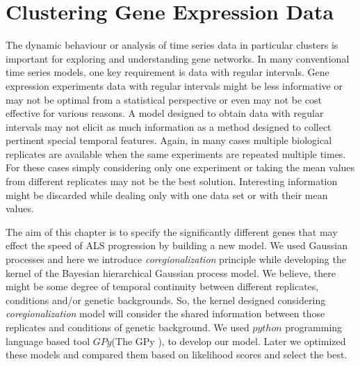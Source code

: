 
\chapter{Clustering Gene Expression Data}\label{ch:Clustering_Gene_Expression_Data}

\ifpdf
    \graphicspath{{Chapter5/Figs/Raster/}{Chapter5/Figs/PDF/}{Chapter5/Figs/}}
\else
    \graphicspath{{Chapter5/Figs/Vector/}{Chapter5/Figs/}}
\fi

The dynamic behaviour or analysis of time series data in particular clusters is important for exploring and understanding gene networks. In many conventional time series models, one key requirement is data with regular intervals. Gene expression experiments data with regular intervals might be less informative or may not be optimal from a statistical perspective or even may not be cost effective for various reasons. A model designed to obtain data with regular intervals may not elicit as much information as a method designed to collect pertinent special temporal features. Again, in many cases multiple biological replicates are available when the same experiments are repeated multiple times. For these cases simply considering only one experiment or taking the mean values from different replicates may not be the best solution. Interesting information might be discarded while dealing only with one data set or with their mean values.

The aim of this chapter is to specify the significantly different genes that may effect the speed of ALS progression by building a new model. We used Gaussian processes and here we introduce  \emph{coregionalization} principle while developing the kernel of the Bayesian hierarchical Gaussian process model. We believe, there might be some degree of temporal continuity between different replicates, conditions and/or genetic backgrounds. So, the kernel designed considering \emph{coregionalization} model will consider the shared information between those replicates and conditions of genetic background. We used $python$ programming language based tool $GPy$(The GPy \cite{gpy2014}), to develop our model. Later we optimized these models and compared them based on likelihood scores and select the best. %

